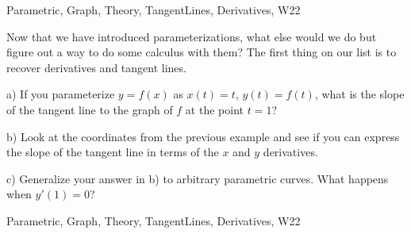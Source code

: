 \begin{tagblock}{Parametric, Graph, Theory, TangentLines, Derivatives, W22}
\begin{question}

 Now that we have introduced parameterizations, what else would we do but figure out a way to do some calculus with them? The first thing on our list is to recover derivatives and tangent lines. 

\bigskip

a) If you parameterize $y=f(x)$ as $x(t)=t$, $y(t)=f(t)$, what is the slope of the tangent line to the graph of $f$ at the point $t=1$?

\bigskip

b) Look at the coordinates from the previous example and see if you can express the slope of the tangent line in terms of the $x$ and $y$ derivatives.

\bigskip

c) Generalize your answer in b) to arbitrary parametric curves. What happens when $y'(1)=0$?
	
	
\begin{tags}
	    Parametric, Graph, Theory, TangentLines, Derivatives, W22
\end{tags}
	
\begin{diary}
\end{diary}
	
\begin{solution}
	   
\end{solution}
	
\end{question}

\end{tagblock}

